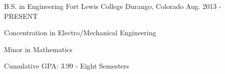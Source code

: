 \begin{cventries}
  \cventry
    {B.S. in Engineering}
    {Fort Lewis College}
    {Durango, Colorado}
    {Aug. 2013 - PRESENT}
    {
      \begin{cvitems}
        \item {Concentration in Electro/Mechanical Engineering}
        \item {Minor in Mathematics}
        \item {Cumulative GPA: 3.99 - Eight Semesters}
      \end{cvitems}
    }

\end{cventries}
